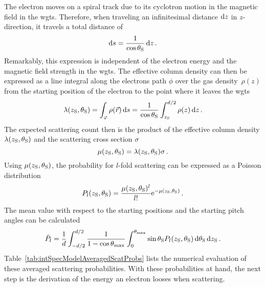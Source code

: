 The electron moves on a spiral track due to its cyclotron motion in the magnetic field in the \gls{wgts}. Therefore, when traveling an infinitesimal distance $\mathop{}\!\mathrm{d} z$ in $z$-direction, it travels a total distance of
\begin{equation}
\label{eq:intSpecModelInfinitesimalElecPath}
\mathop{}\!\mathrm{d} s = \frac{1}{\cos\theta_\mathrm{S}} \mathop{}\!\mathrm{d} z 
\text{\,.}
\end{equation}
Remarkably, this expression is independent of the electron energy and the magnetic field strength in the \gls{wgts}. The effective column density can then be expressed as a line integral along the electrons path $\phi$ over the gas density~$\rho(z)$ from the starting position of the electron to the point where it leaves the \gls{wgts}
\begin{equation}
\label{eq:intSpecModelEffColumnDensity}
\lambda(z_\mathrm{S},\theta_\mathrm{S}) = 
\int_{\varphi} \rho(\Vec{r})\mathop{}\!\mathrm{d} s =
\frac{1}{\cos\theta_\mathrm{S}}
\int_{z_\mathrm{S}}^{d/2} \rho(z)\mathop{}\!\mathrm{d} z
\text{\,.}
\end{equation}
The expected scattering count then is the product of the effective column density $\lambda(z_\mathrm{S},\theta_\mathrm{S})$ and the scattering cross section $\sigma$~\cite{Groh2015}
\begin{equation}
\label{eq:intSpecModelExpectedScatteringCount}
\mu(z_\mathrm{S}, \theta_\mathrm{S}) = \lambda(z_\mathrm{S},\theta_\mathrm{S}) \sigma \text{\,.}
\end{equation}
Using $\mu(z_\mathrm{S}, \theta_\mathrm{S})$, the probability for $l$-fold scattering can be expressed as a Poisson distribution~\cite{Groh2015}
\begin{equation}
\label{eq:intSpecModelNonAveragedScatProbs}
P_l(z_\mathrm{S}, \theta_\mathrm{S}) = 
\frac{
	\mu(z_\mathrm{S}, \theta_\mathrm{S})^l
}{l!}
\mathrm{e}^{-\mu(z_\mathrm{S}, \theta_\mathrm{S})} \text{\,.}
\end{equation}
The mean value with respect to the starting positions and the starting pitch angles can be calculated~\cite{Groh2015}
\begin{equation}
	\label{eq:intSpecModelAveragedScatProbs}
	\bar{P}_l =
	\frac{1}{d}
	\int_{-d/2}^{d/2}
		\frac{1}{1-\cos\theta_\mathrm{max}}
		\int_{0}^{\theta_\mathrm{max}}
			\sin\theta_\mathrm{S}
			P_l(z_\mathrm{S},\theta_\mathrm{S})
		\mathop{}\!\mathrm{d} \theta_\mathrm{S}
	\mathop{}\!\mathrm{d} z_\mathrm{S}
	\text{\,.}
\end{equation}
Table~\ref{tab:intSpecModelAveragedScatProbs} lists the numerical evaluation of these averaged scattering probabilities. With these probabilities at hand, the next step is the derivation of the energy an electron looses when scattering.

